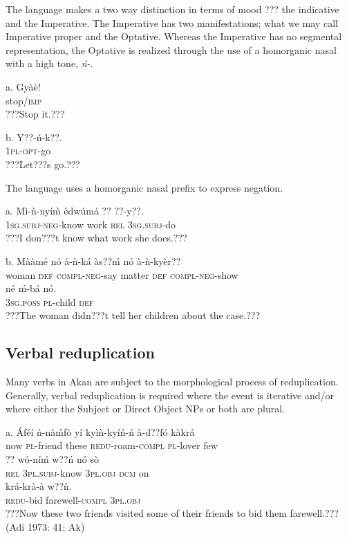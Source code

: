 \documentclass[output=paper]{langsci/langscibook}
\begin{document}
The language makes a two way distinction in terms of mood ??? the indicative and the Imperative. The Imperative has two manifestations; what we may call Imperative proper and the Optative. Whereas the Imperative has no segmental representation, the Optative is realized through the use of a homorganic nasal with a high tone, \emph{ń-}. 

\ea
\gll a.  Gyàè!\\
       stop/\textsc{imp}\\
\glt   ???Stop it.???
\z


\ea
\gll  b.  Y??-ń-k??.\\
       \textsc{1pl}{}-\textsc{opt}{}-go\\
\glt   ???Let???s go.???
\z

The language uses a homorganic nasal prefix to express negation.


\ea
\gll a.  Mì-ǹ-nyí\`{m}     èdwúmá  ??   ??{}-y??.\\
       \textsc{1sg.subj}{}-\textsc{neg}{}-know  work    \textsc{rel}  \textsc{3sg.subj}{}-do\\
\glt   ???I don???t know what work she does.???
\z

\ea
\gll  b.  Mààmé    nó  à-ǹ-ká       às??ḿ  nó  à-ǹ-kyèr??\\
       woman    \textsc{def}  \textsc{compl}{}-\textsc{neg}{}-say  matter  \textsc{def  compl}{}-\textsc{neg}{}-show\\
\gll   né    ḿ-bá    nó.\\
       \textsc{3sg.poss}  \textsc{pl}{}-child  \textsc{def}\\
\glt   ???The woman didn???t tell her children about the case.???  
\z

\subsection{Verbal reduplication}

Many verbs in Akan are subject to the morphological process of reduplication. Generally, verbal reduplication is required where the event is iterative and/or where either the Subject or Direct Object NPs or both are plural.

\ea
\gll a.  \'{A}féí  ǹ-nà\`{m}fò   yí   kyìǹ-kyíń-ń     à-d??fó     kàkrá \\
       now  \textsc{pl}{}-friend  these  \textsc{redu}{}-roam-\textsc{compl}  \textsc{pl}{}-lover  few  \\
\gll   ??  wó-níḿ     w??ń     nó   sò \\
       \textsc{rel}  \textsc{3pl.subj}{}-know  \textsc{3pl.obj}  \textsc{dcm}  on\\
\gll   krá-krà-à       w??ǹ.\\
       \textsc{redu}{}-bid farewell-\textsc{compl}  \textsc{3pl.obj}\\
\glt   ???Now these two friends visited some of their friends to bid them farewell.??? (Adi 1973: 41; Ak)
\z
\end{document}
